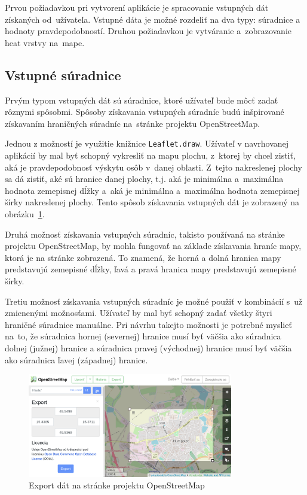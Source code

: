 Prvou požiadavkou pri vytvorení aplikácie je spracovanie vstupných dát získaných od~užívateľa. Vstupné dáta je možné rozdeliť na dva typy: súradnice a hodnoty pravdepodobností. Druhou požiadavkou je vytváranie a~zobrazovanie heat vrstvy na~mape.

\subsection*{Vstupné súradnice}
Prvým typom vstupných dát sú súradnice, ktoré užívateľ bude môcť zadať rôznymi spôsobmi. Spôsoby získavania vstupných súradníc budú inšpirované získavaním hraničných súradníc na~stránke projektu OpenStreetMap.

Jednou z možností je využitie knižnice \texttt{Leaflet.draw}. Užívateľ v navrhovanej aplikácií by mal byť schopný vykresliť na mapu plochu, z~ktorej by chcel zistiť, aká je pravdepodobnosť výskytu osôb v~danej oblasti. Z~tejto nakreslenej plochy sa dá zistiť, aké sú hranice danej plochy, t.j. aká je minimálna a~maximálna hodnota zemepisnej dĺžky a~aká je minimálna a~maximálna hodnota zemepisnej šírky nakreslenej plochy. Tento spôsob získavania vstupných dát je zobrazený na obrázku~\ref{fig:osm-export}.

Druhá možnosť získavania vstupných súradníc, takisto používaná na stránke projektu OpenStreetMap, by mohla fungovať na základe získavania hraníc mapy, ktorá je na stránke zobrazená. To znamená, že horná a dolná hranica mapy predstavujú zemepisné dĺžky, ľavá a pravá hranica mapy predstavujú zemepisné šírky.

Tretiu možnosť získavania vstupných súradníc je možné použiť v kombinácií s~už zmienenými možnosťami. Užívateľ by mal byť schopný zadať všetky štyri hraničné súradnice manuálne. Pri návrhu takejto možnosti je potrebné myslieť na~to, že súradnica hornej (severnej) hranice musí byť väčšia ako súradnica dolnej (južnej) hranice a súradnica pravej (východnej) hranice musí byť väčšia ako súradnica ľavej (západnej) hranice.

\begin{figure}[ht]
    \centering
    \includegraphics[width=0.8\textwidth]{obrazky-figures/openstreetmap-export.png}
    \caption{Export dát na stránke projektu OpenStreetMap}
    \label{fig:osm-export}
\end{figure}
    
